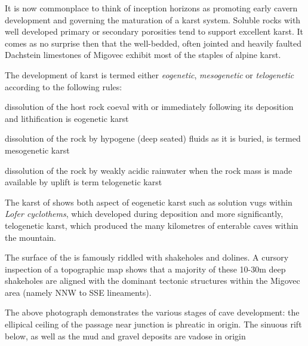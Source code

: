 It is now commonplace to think of inception horizons \citep{lowe1997carbonate} as promoting early cavern development and governing the maturation of a karst system. Soluble rocks with well developed primary or secondary porosities tend to support excellent karst. It comes as no surprise then that the well-bedded, often jointed and heavily faulted Dachstein limestones of Migovec exhibit most of the staples of alpine karst.

The development of karst is termed either \emph{eogenetic}, \emph{mesogenetic} or \emph{telogenetic} according to the following rules:
\begin{citemize}
\item dissolution of the host rock coeval with or immediately following its deposition and lithification is eogenetic karst 
\item dissolution of the rock by hypogene (deep seated) fluids as it is buried, is termed mesogenetic karst
\item dissolution of the rock by weakly acidic rainwater when the rock mass is made available by uplift is term telogenetic karst
\end{citemize}

The karst of  shows both aspect of eogenetic karst such as solution vugs within \emph{Lofer cyclothems}, which developed during deposition and more significantly, telogenetic karst, which produced the many kilometres of enterable caves within the mountain.

The surface of the  is famously riddled with shakeholes and dolines. A cursory inspection of a topographic map shows that a majority of these 10-30m deep shakeholes are aligned with the dominant tectonic structures within the Migovec area (namely NNW to SSE lineaments). 

\begin{marginfigure}
\caption{The above photograph demonstrates the various stages of cave development: the ellipical ceiling of the passage near  junction is phreatic in origin. The sinuous rift below, as well as the mud and gravel deposits are vadose in origin }
\label{fig:dachstein}
\end{marginfigure}

